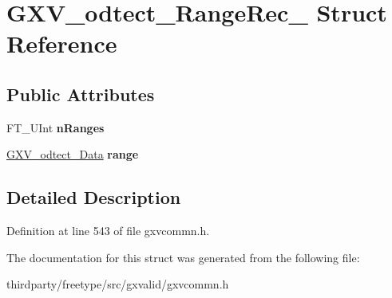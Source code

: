 \hypertarget{struct_g_x_v__odtect___range_rec__}{}\section{G\+X\+V\+\_\+odtect\+\_\+\+Range\+Rec\+\_\+ Struct Reference}
\label{struct_g_x_v__odtect___range_rec__}
\subsection*{Public Attributes}
\begin{DoxyCompactItemize}
\item 
\mbox{\label{struct_g_x_v__odtect___range_rec___a4efa4fef5ec79fcf929e31365d392a24}} 
F\+T\+\_\+\+U\+Int {\bfseries n\+Ranges}
\item 
\mbox{\label{struct_g_x_v__odtect___range_rec___a2b1faf221e0b494e4d51d7c9f9217e11}} 
\hyperlink{struct_g_x_v__odtect___data_rec__}{G\+X\+V\+\_\+odtect\+\_\+\+Data} {\bfseries range}
\end{DoxyCompactItemize}


\subsection{Detailed Description}


Definition at line 543 of file gxvcommn.\+h.



The documentation for this struct was generated from the following file\+:\begin{DoxyCompactItemize}
\item 
thirdparty/freetype/src/gxvalid/gxvcommn.\+h\end{DoxyCompactItemize}
